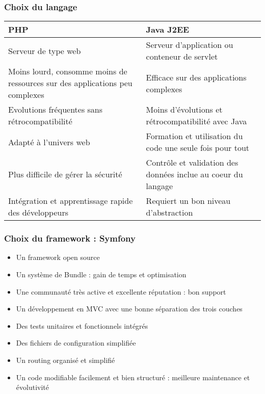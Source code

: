 \begin{frame}
  \frametitle{Choix du langage}
  \begin{center}
    \begin{tabular}[h]{|p{}|p{}|}
	\hline
	\cellcolor{blue!15}PHP & \cellcolor{blue!15}Java J2EE \\\hline
        Serveur de type web & Serveur d'application ou conteneur de servlet \\\hline
        Moins lourd, consomme moins de ressources sur des applications peu complexes & Efficace sur des applications complexes \\\hline
        Evolutions fréquentes sans rétrocompatibilité & Moins d'évolutions et rétrocompatibilité avec Java \\\hline
        Adapté à l'univers web & Formation et utilisation du code une seule fois pour tout \\\hline
        Plus difficile de gérer la sécurité & Contrôle et validation des données inclue au coeur du langage \\\hline
        Intégration et apprentissage rapide des développeurs & Requiert un bon niveau d'abstraction \\\hline
    \end{tabular}
  \end{center}
\end{frame}

\begin{frame}
  \frametitle{Choix du framework : Symfony}
  \begin{itemize}
    \item Un framework open source
    \item Un système de Bundle : gain de temps et optimisation
    \item Une communauté très active et excellente réputation : bon support  
    \item Un développement en MVC avec une bonne séparation des trois couches
    \item Des tests unitaires et fonctionnels intégrés
    \item Des fichiers de configuration simplifiée
    \item Un routing organisé et simplifié
    \item Un code modifiable facilement et bien structuré : meilleure maintenance et évolutivité
  \end{itemize}
\end{frame}
